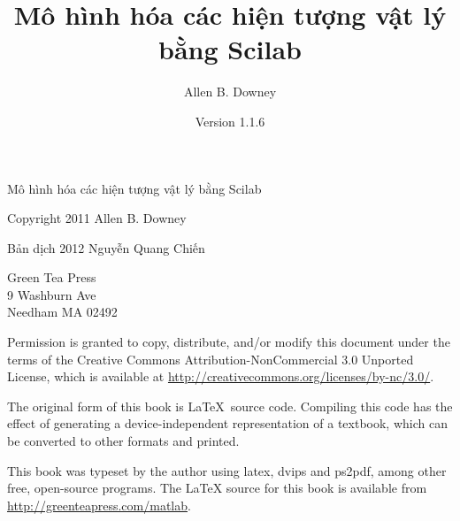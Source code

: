 \documentclass[12pt]{book}
\begin{document}
\frontmatter


\newcommand{\thetitle}{Mô hình hóa các hiện tượng vật lý bằng Scilab}
\newcommand{\theversion}{1.1.6}

\title {\thetitle}
\author {Allen B. Downey}
\date {Version \theversion}





\vspace{2in}

\begin{center}
{\Large \thetitle}

\vspace{0.25in}

Copyright 2011 Allen B. Downey

Bản dịch 2012 Nguyễn Quang Chiến
\end{center}

\vspace{0.25in}

\begin{flushleft}
Green Tea Press       \\
9 Washburn Ave \\
Needham MA 02492
\end{flushleft}

Permission is granted to copy, distribute, and/or modify this document
under the terms of the Creative Commons Attribution-NonCommercial 3.0 Unported
License, which is available at \url{http://creativecommons.org/licenses/by-nc/3.0/}.

The original form of this book is \LaTeX\ source code.  Compiling this
code has the effect of generating a device-independent representation
of a textbook, which can be converted to other formats and printed.

This book was typeset by the author using latex, dvips and ps2pdf,
among other free, open-source programs.
The LaTeX source for this book is available from
\url{http://greenteapress.com/matlab}.


\end{document}
